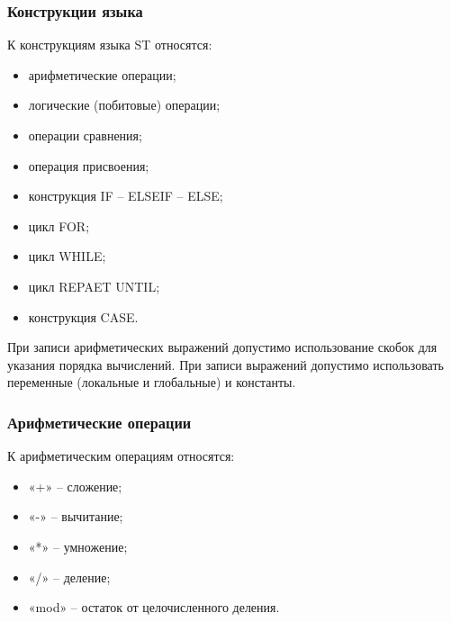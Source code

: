 \documentclass[letterpaper,10pt,russian]{sphinxmanual}
\begin{document}
\subsubsection{Конструкции языка}
\label{iec_guide/st_guide:id3}
К конструкциям языка ST относятся:
\begin{itemize}
\item {} 
арифметические операции;

\item {} 
логические (побитовые) операции;

\item {} 
операции сравнения;

\item {} 
операция присвоения;

\item {} 
конструкция IF – ELSEIF – ELSE;

\item {} 
цикл FOR;

\item {} 
цикл WHILE;

\item {} 
цикл REPAET UNTIL;

\item {} 
конструкция CASE.

\end{itemize}

При записи арифметических выражений допустимо использование скобок для
указания порядка вычислений. При записи выражений допустимо использовать
переменные (локальные и глобальные) и константы.


\subsubsection{Арифметические операции}
\label{iec_guide/st_guide:id4}
К арифметическим операциям относятся:
\begin{itemize}
\item {} 
«+» – сложение;

\item {} 
«-» – вычитание;

\item {} 
«*» – умножение;

\item {} 
«/» – деление;

\item {} 
«mod» – остаток от целочисленного деления.

\end{itemize}
\end{document}
